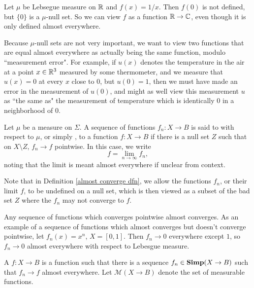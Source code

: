 \begin{example}
Let $\mu$ be Lebsegue measure on $\mathbb{R}$ and $f(x) = 1/x$.
Then $f(0)$ is not defined, but $\{0\}$ is a $\mu$-null set.
So we can view $f$ as a function $\mathbb{R} \to \mathbb{C}$, even though it is only defined almost everywhere.
\end{example}

\begin{subsec}
Because $\mu$-null sets are not very important, we want to view two functions that are equal almost everywhere as actually being the same function, modulo ``measurement error".
For example, if $u(x)$ denotes the temperature in the air at a point $x \in \mathbb{R}^3$ measured by some thermometer, and we measure that $u(x) = 0$ at every $x$ close to $0$, but $u(0) = 1$, then we must have made an error in the measurement of $u(0)$, and might as well view this measurement $u$ as ``the same as" the measurement of temperature which is identically $0$ in a neighborhood of $0$.
\end{subsec}

\begin{definition}
\label{almost converge dfn}
Let $\mu$ be a measure on $\Sigma$. A sequence of functions $f_n: X \to B$ is said to  with respect to $\mu$, or simply , to a function $f: X \to B$ if there is a null set $Z$ such that on $X \setminus Z$, $f_n \to f$ pointwise. In this case, we write
\[f = \lim_{n \to \infty} f_n,\]
noting that the limit is meant almost everywhere if unclear from context.
\end{definition}

\begin{subsec}
Note that in Definition \ref{almost converge dfn}, we allow the functions $f_n$, or their limit $f$, to be undefined on a null set, which is then viewed as a subset of the bad set $Z$ where the $f_n$ may not converge to $f$.
\end{subsec}

\begin{example}
Any sequence of functions which converges pointwise almost converges.
As an example of a sequence of functions which almost converges but doesn't converge pointwise, let $f_n(x) = x^n$, $X = [0, 1]$. Then $f_n \to 0$ everywhere except $1$, so $f_n \to 0$ almost everywhere with respect to Lebesgue measure.
\end{example}

\begin{definition}
A  $f: X \to B$ is a function such that there is a sequence $f_n \in \mathbf{Simp}(X \to B)$ such that $f_n \to f$ almost everywhere.
Let $\mathcal M(X \to B)$ denote the set of measurable functions.
\end{definition}

